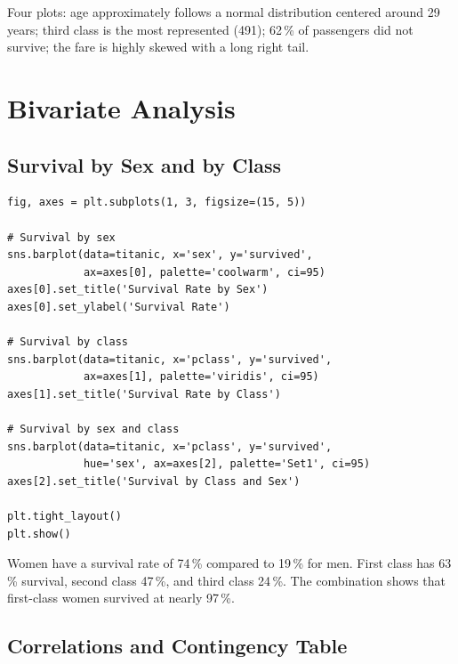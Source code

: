\begin{codeoutput}
Four plots: age approximately follows a normal distribution centered around 29 years; third class is the most represented (491); 62\,\% of passengers did not survive; the fare is highly skewed with a long right tail.
\end{codeoutput}

\section{Bivariate Analysis}

\subsection{Survival by Sex and by Class}

\begin{codeblock}[title=\textbf{Python}]
\begin{verbatim}
fig, axes = plt.subplots(1, 3, figsize=(15, 5))

# Survival by sex
sns.barplot(data=titanic, x='sex', y='survived',
            ax=axes[0], palette='coolwarm', ci=95)
axes[0].set_title('Survival Rate by Sex')
axes[0].set_ylabel('Survival Rate')

# Survival by class
sns.barplot(data=titanic, x='pclass', y='survived',
            ax=axes[1], palette='viridis', ci=95)
axes[1].set_title('Survival Rate by Class')

# Survival by sex and class
sns.barplot(data=titanic, x='pclass', y='survived',
            hue='sex', ax=axes[2], palette='Set1', ci=95)
axes[2].set_title('Survival by Class and Sex')

plt.tight_layout()
plt.show()
\end{verbatim}
\end{codeblock}

\begin{codeoutput}
Women have a survival rate of 74\,\% compared to 19\,\% for men. First class has 63\,\% survival, second class 47\,\%, and third class 24\,\%. The combination shows that first-class women survived at nearly 97\,\%.
\end{codeoutput}

\subsection{Correlations and Contingency Table}

